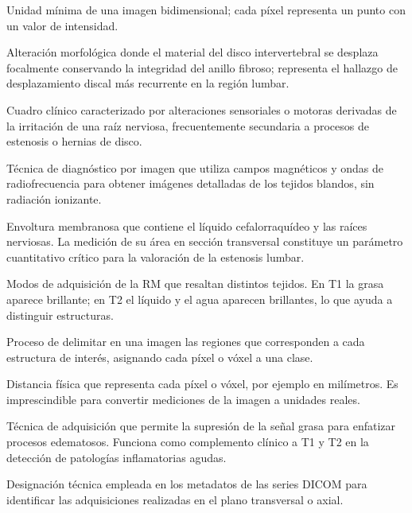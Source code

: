 \begin{description}[leftmargin=3.8cm, style=nextline, itemsep=3pt, topsep=3pt]
    \item[Píxel] Unidad mínima de una imagen bidimensional; cada píxel representa un punto con un valor de intensidad.

    \item[Protrusión discal] Alteración morfológica donde el material del disco intervertebral se desplaza focalmente conservando la integridad del anillo fibroso; representa el hallazgo de desplazamiento discal más recurrente en la región lumbar.

    \item[Radiculopatía] Cuadro clínico caracterizado por alteraciones sensoriales o motoras derivadas de la irritación de una raíz nerviosa, frecuentemente secundaria a procesos de estenosis o hernias de disco.

    \item[RM, resonancia magnética] Técnica de diagnóstico por imagen que utiliza campos magnéticos y ondas de radiofrecuencia para obtener imágenes detalladas de los tejidos blandos, sin radiación ionizante.

    \item[Saco tecal (saco dural)] Envoltura membranosa que contiene el líquido cefalorraquídeo y las raíces nerviosas. La medición de su área en sección transversal constituye un parámetro cuantitativo crítico para la valoración de la estenosis lumbar.

    \item[Secuencias T1 y T2] Modos de adquisición de la RM que resaltan distintos tejidos. En T1 la grasa aparece brillante; en T2 el líquido y el agua aparecen brillantes, lo que ayuda a distinguir estructuras.

    \item[Segmentación] Proceso de delimitar en una imagen las regiones que corresponden a cada estructura de interés, asignando cada píxel o vóxel a una clase.

    \item[Spacing, espaciado] Distancia física que representa cada píxel o vóxel, por ejemplo en milímetros. Es imprescindible para convertir mediciones de la imagen a unidades reales.

    \item[STIR (Short Tau Inversion Recovery)] Técnica de adquisición que permite la supresión de la señal grasa para enfatizar procesos edematosos. Funciona como complemento clínico a T1 y T2 en la detección de patologías inflamatorias agudas.

    \item[TRA (transverse)] Designación técnica empleada en los metadatos de las series DICOM para identificar las adquisiciones realizadas en el plano transversal o axial.


\end{description}
